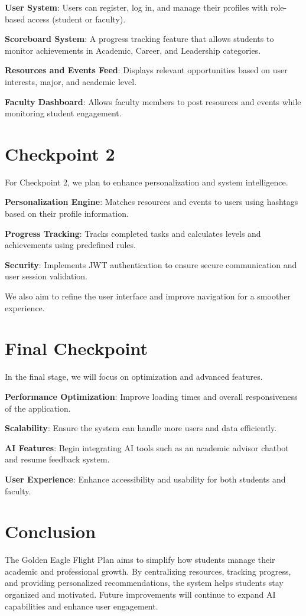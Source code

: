 \documentclass{article}
\begin{document}
\textbf{User System}: Users can register, log in, and manage their profiles with role-based access (student or faculty).

\textbf{Scoreboard System}: A progress tracking feature that allows students to monitor achievements in Academic, Career, and Leadership categories.

\textbf{Resources and Events Feed}: Displays relevant opportunities based on user interests, major, and academic level.

\textbf{Faculty Dashboard}: Allows faculty members to post resources and events while monitoring student engagement.

\section{Checkpoint 2}
For Checkpoint 2, we plan to enhance personalization and system intelligence.

\textbf{Personalization Engine}: Matches resources and events to users using hashtags based on their profile information.

\textbf{Progress Tracking}: Tracks completed tasks and calculates levels and achievements using predefined rules.

\textbf{Security}: Implements JWT authentication to ensure secure communication and user session validation.

We also aim to refine the user interface and improve navigation for a smoother experience.

\section{Final Checkpoint}
In the final stage, we will focus on optimization and advanced features.

\textbf{Performance Optimization}: Improve loading times and overall responsiveness of the application.

\textbf{Scalability}: Ensure the system can handle more users and data efficiently.

\textbf{AI Features}: Begin integrating AI tools such as an academic advisor chatbot and resume feedback system.

\textbf{User Experience}: Enhance accessibility and usability for both students and faculty.

\section{Conclusion}
The Golden Eagle Flight Plan aims to simplify how students manage their academic and professional growth. By centralizing resources, tracking progress, and providing personalized recommendations, the system helps students stay organized and motivated. Future improvements will continue to expand AI capabilities and enhance user engagement.
\end{document}
